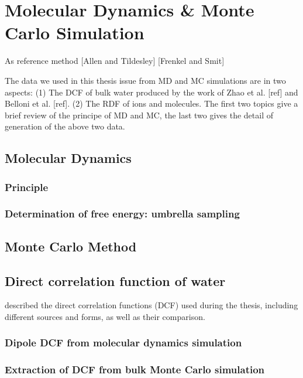 
\chapter{Molecular Dynamics \& Monte Carlo Simulation\label{chpt:reference-method}}

As reference method {[}Allen and Tildesley{]} {[}Frenkel and Smit{]}

The data we used in this thesis issue from \acs{MD} and \acs{MC}
simulations are in two aspects: (1) The \acs{DCF} of bulk water produced
by the work of Zhao et al. {[}ref{]} and Belloni et al. {[}ref{]}.
(2) The \acf{RDF} of ions and molecules. The first two topics give
a brief review of the principe of \acs{MD} and \acs{MC}, the last
two gives the detail of generation of the above two data.


\section{Molecular Dynamics}


\subsection{Principle}


\subsection{Determination of free energy: umbrella sampling}


\section{Monte Carlo Method}


\section{Direct correlation function of water}

described the direct correlation functions (\acs{DCF}) used during
the thesis, including different sources and forms, as well as their
comparison.


\subsection{Dipole DCF from molecular dynamics simulation}


\subsection{Extraction of DCF from bulk Monte Carlo simulation}

